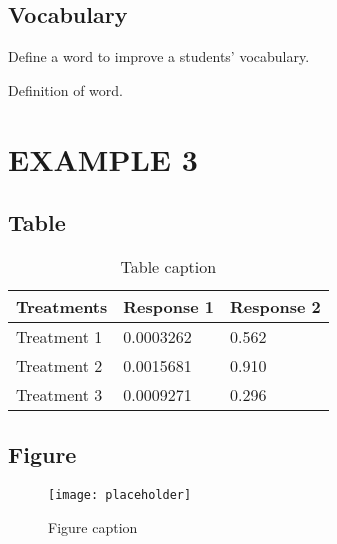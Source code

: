 \documentclass[11pt,fleqn,openany]{book} %
\begin{document}

\section{Vocabulary}

Define a word to improve a students' vocabulary.

\begin{vocabulary}[Word]
Definition of word.
\end{vocabulary}



\chapter{EXAMPLE 3}

\section{Table}

\begin{table}[h]
\centering
\begin{tabular}{l l l}
\toprule
\textbf{Treatments} & \textbf{Response 1} & \textbf{Response 2}\\
\midrule
Treatment 1 & 0.0003262 & 0.562 \\
Treatment 2 & 0.0015681 & 0.910 \\
Treatment 3 & 0.0009271 & 0.296 \\
\bottomrule
\end{tabular}
\caption{Table caption}
\end{table}


\section{Figure}

\begin{figure}[h]
\centering\texttt{[image: placeholder]}
\caption{Figure caption}
\end{figure}


\end{document}
